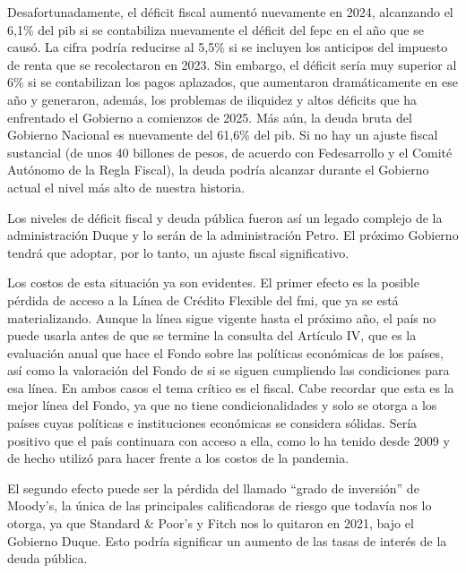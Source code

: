 \begin{prologo}
Desafortunadamente, el déficit fiscal aumentó nuevamente en 2024, alcanzando el 6,1\% del \gls{pib} si se contabiliza nuevamente el déficit del \gls{fepc} en el año que se causó. La cifra podría reducirse al 5,5\% si se incluyen los anticipos del impuesto de renta que se recolectaron en 2023. Sin embargo, el déficit sería muy superior al 6\% si se contabilizan los pagos aplazados, que aumentaron dramáticamente en ese año y generaron, además, los problemas de iliquidez y altos déficits que ha enfrentado el Gobierno a comienzos de 2025. Más aún, la deuda bruta del Gobierno Nacional es nuevamente del 61,6\% del \gls{pib}. Si no hay un ajuste fiscal sustancial (de unos 40 billones de pesos, de acuerdo con Fedesarrollo y el Comité Autónomo de la Regla Fiscal), la deuda podría alcanzar durante el Gobierno actual el nivel más alto de nuestra historia. 

Los niveles de déficit fiscal y deuda pública fueron así un legado complejo de la administración Duque y lo serán de la administración Petro. El próximo Gobierno tendrá que adoptar, por lo tanto, un ajuste fiscal significativo. 

Los costos de esta situación ya son evidentes. El primer efecto es la posible pérdida de acceso a la Línea de Crédito Flexible del \gls{fmi}, que ya se está materializando. Aunque la línea sigue vigente hasta el próximo año, el país no puede usarla antes de que se termine la consulta del Artículo IV, que es la evaluación anual que hace el Fondo sobre las políticas económicas de los países, así como la valoración del Fondo de si se siguen cumpliendo las condiciones para esa línea. En ambos casos el tema crítico es el fiscal. Cabe recordar que esta es la mejor línea del Fondo, ya que no tiene condicionalidades y solo se otorga a los países cuyas políticas e instituciones económicas se considera sólidas. Sería positivo que el país continuara con acceso a ella, como lo ha tenido desde 2009 y de hecho utilizó para hacer frente a los costos de la pandemia. 

El segundo efecto puede ser la pérdida del llamado “grado de inversión” de Moody’s, la única de las principales calificadoras de riesgo que todavía nos lo otorga, ya que Standard \& Poor’s y Fitch nos lo quitaron en 2021, bajo el Gobierno Duque. Esto podría significar un aumento de las tasas de interés de la deuda pública.


\end{prologo}
